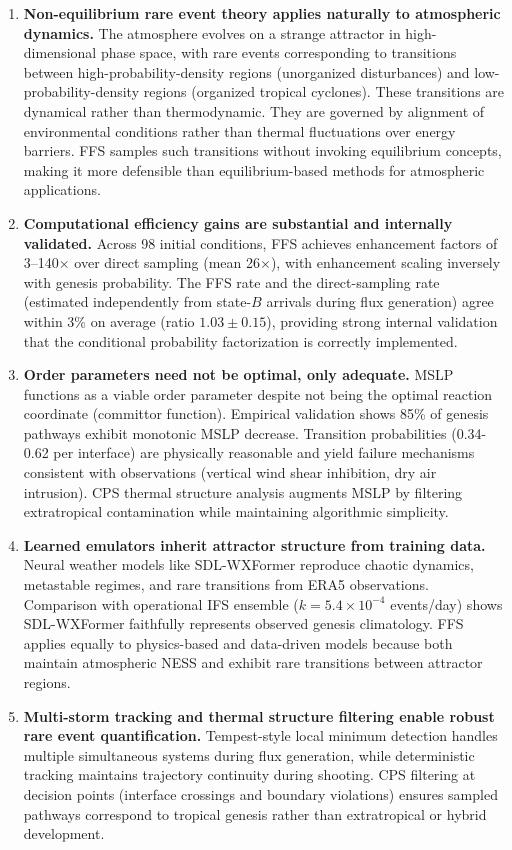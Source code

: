 \documentclass[11pt]{article}
\begin{document}
\begin{enumerate}
    \item \textbf{Non-equilibrium rare event theory applies naturally to atmospheric dynamics.} The atmosphere evolves on a strange attractor in high-dimensional phase space, with rare events corresponding to transitions between high-probability-density regions (unorganized disturbances) and low-probability-density regions (organized tropical cyclones). These transitions are dynamical rather than thermodynamic. They are governed by alignment of environmental conditions rather than thermal fluctuations over energy barriers. FFS samples such transitions without invoking equilibrium concepts, making it more defensible than equilibrium-based methods for atmospheric applications.
    
    \item \textbf{Computational efficiency gains are substantial and internally validated.} Across 98 initial conditions, FFS achieves enhancement factors of 3--140$\times$ over direct sampling (mean 26$\times$), with enhancement scaling inversely with genesis probability. The FFS rate and the direct-sampling rate (estimated independently from state-$B$ arrivals during flux generation) agree within 3\% on average (ratio $1.03 \pm 0.15$), providing strong internal validation that the conditional probability factorization is correctly implemented.
    
    \item \textbf{Order parameters need not be optimal, only adequate.} MSLP functions as a viable order parameter despite not being the optimal reaction coordinate (committor function). Empirical validation shows 85\% of genesis pathways exhibit monotonic MSLP decrease. Transition probabilities (0.34-0.62 per interface) are physically reasonable and yield failure mechanisms consistent with observations (vertical wind shear inhibition, dry air intrusion). CPS thermal structure analysis augments MSLP by filtering extratropical contamination while maintaining algorithmic simplicity.
    
    \item \textbf{Learned emulators inherit attractor structure from training data.} Neural weather models like SDL-WXFormer reproduce chaotic dynamics, metastable regimes, and rare transitions from ERA5 observations. Comparison with operational IFS ensemble ($k = 5.4 \times 10^{-4}$ events/day) shows SDL-WXFormer faithfully represents observed genesis climatology. FFS applies equally to physics-based and data-driven models because both maintain atmospheric NESS and exhibit rare transitions between attractor regions.
    
    \item \textbf{Multi-storm tracking and thermal structure filtering enable robust rare event quantification.} Tempest-style local minimum detection handles multiple simultaneous systems during flux generation, while deterministic tracking maintains trajectory continuity during shooting. CPS filtering at decision points (interface crossings and boundary violations) ensures sampled pathways correspond to tropical genesis rather than extratropical or hybrid development.
\end{enumerate}
\end{document}
